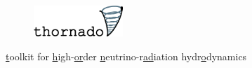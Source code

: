 \documentclass{beamer}
\begin{document}
\begin{frame}

  \vspace{-10em}

  \begin{figure}[ht]
    \centering
    \includegraphics[width=0.3\textwidth]{fig.thornado_logo.png}
  \end{figure}

  \begin{center}
    \ul{t}oolkit for
    \ul{h}igh-\ul{or}der
    \ul{n}eutrino-r\ul{ad}iation hydr\ul{o}dynamics
  \end{center}

\end{frame}
\end{document}
